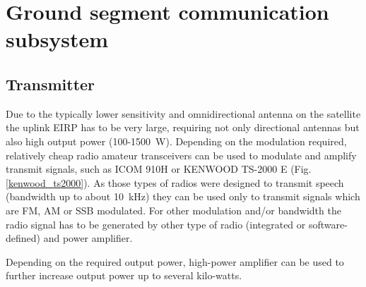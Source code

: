 \section{Ground segment communication subsystem}
\subsection{Transmitter}
Due to the typically lower sensitivity and omnidirectional antenna on the satellite the uplink EIRP has to be very large, requiring not only directional antennas but also high output power (\si{100}-\SI{1500}{\watt}).
Depending on the modulation required, relatively cheap radio amateur transceivers can be used to modulate and amplify transmit signals, such as ICOM 910H or KENWOOD TS-2000 E (Fig. \ref{kenwood_ts2000}). As those types of radios were designed to transmit speech (bandwidth up to about \SI{10}{\kHz}) they can be used only to transmit signals which are FM, AM or SSB modulated. For other modulation and/or bandwidth the radio signal has to be generated by other type of radio (integrated or software-defined) and power amplifier.

Depending on the required output power, high-power amplifier can be used to further increase output power up to several kilo-watts. 


